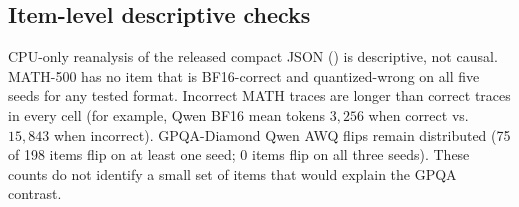 \documentclass[11pt,a4paper]{article}
\begin{document}
\begin{table}[t]
\centering
\caption{MATH-500 seed-averaged pass@1 (\%) by difficulty level, joined to the public dataset by exact question text. $n$: items per level. Last rows: Llama AWQ-4 minus BF16 paired difference (pp) with an item-level 95\% CI ($B=10{,}000$). Per-level intervals are exploratory.}
\label{tab:levels}
\small
{}
\end{table}

\subsection{Item-level descriptive checks}
CPU-only reanalysis of the released compact JSON () is descriptive, not causal. MATH-500 has no item that is BF16-correct and quantized-wrong on all five seeds for any tested format. Incorrect MATH traces are longer than correct traces in every cell (for example, Qwen BF16 mean tokens $3{,}256$ when correct vs.\ $15{,}843$ when incorrect). GPQA-Diamond Qwen AWQ flips remain distributed (75 of 198 items flip on at least one seed; 0 items flip on all three seeds). These counts do not identify a small set of items that would explain the GPQA contrast.
\end{document}
